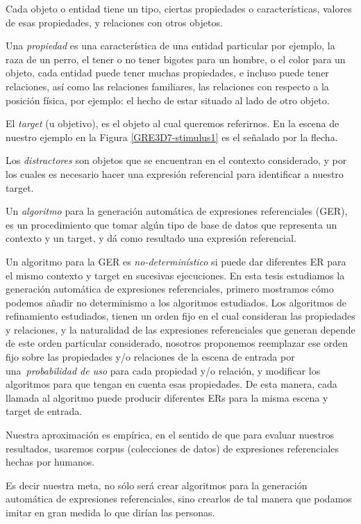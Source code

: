 Cada objeto o entidad tiene un tipo, ciertas propiedades o caracter\'isticas, valores de esas propiedades, y relaciones con otros objetos.

Una {\it propiedad} es una caracter\'istica de una entidad particular por ejemplo, la raza de un perro, el tener o no tener bigotes para un hombre, o el color para un objeto, cada entidad puede tener muchas propiedades, e incluso puede tener relaciones, as\'i como las relaciones familiares, las relaciones con respecto a la posici\'on f\'isica, por ejemplo: el hecho de estar situado al lado de otro objeto.

El \emph{target} (u objetivo), es el objeto al cual queremos referirnos. En la escena de nuestro ejemplo en la Figura \ref{GRE3D7-stimulus1} es el se\~nalado por la flecha.

Los \emph{distractores} son objetos que se encuentran en el contexto considerado, y por los cuales es necesario hacer una expresi\'on referencial para identificar a nuestro target. 

Un {\it algoritmo} para la generaci\'on autom\'atica de expresiones referenciales (GER), es un procedimiento que tomar alg\'un tipo de base de datos que representa un contexto y un target, y d\'a como resultado una expresi\'on referencial.

Un algoritmo para la GER es \emph{no-determin\'istico} si puede dar diferentes ER para el mismo contexto y target en sucesivas ejecuciones.
En esta tesis estudiamos la generaci\'on autom\'atica de expresiones referenciales, 
primero mostramos c\'omo podemos a\~nadir no determinismo a los algoritmos estudiados. Los algoritmos de refinamiento estudiados, tienen un orden fijo en el cual consideran las propiedades y relaciones, y la naturalidad de las expresiones referenciales que generan depende de este orden particular considerado, nosotros proponemos reemplazar ese orden fijo sobre las propiedades y/o relaciones de la escena de entrada por una~\emph{probabilidad de uso} para cada propiedad y/o relaci\'on, y modificar los algoritmos para que tengan en cuenta esas propiedades. De esta manera, cada llamada al algoritmo puede producir diferentes ERs para la misma escena y target de entrada. 

Nuestra aproximaci\'on es emp\'irica, en el sentido de que para evaluar nuestros resultados, usaremos corpus (colecciones de datos) de expresiones referenciales hechas por humanos.

Es decir nuestra meta, no s\'olo ser\'a crear algoritmos para la generaci\'on autom\'atica de expresiones referenciales, sino crearlos de tal manera que podamos imitar en gran medida lo que dir\'ian las personas.

